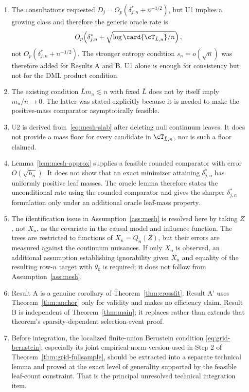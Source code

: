 \begin{enumerate}[label=(\alph*),leftmargin=*]

\item The consultations requested
$D_j=O_p(\delta^*_{j,n}+n^{-1/2})$, but U1 implies a growing class and therefore
the generic oracle rate is
\[
 O_p\!\left(\delta^*_{j,n}
   +\sqrt{\log\card{\cT_{\bar L,n}}/n}\right),
\]
not $O_p(\delta^*_{j,n}+n^{-1/2})$.  The stronger entropy condition
$s_n=o(\sqrt n)$ was therefore added for Results A and B.  U1 alone is enough
for consistency but not for the DML product condition.

\item The existing condition $\bar Lm_n\lesssim n$ with fixed $\bar L$ does not
by itself imply $m_n/n\to0$.  The latter was stated explicitly because it is
needed to make the positive-mass comparator asymptotically feasible.

\item U2 is derived from~\eqref{eq:mesh-slab} after deleting null continuum
leaves.  It does not provide a mass floor for every candidate in
$\cT_{\bar L,n}$, nor is such a floor claimed.

\item Lemma~\ref{lem:mesh-approx} supplies a feasible rounded comparator with
error $O(\sqrt{h_n})$.  It does not show that an exact minimizer attaining
$\delta^*_{j,n}$ has uniformly positive leaf masses.  The oracle lemma
therefore states the unconditional rate using the rounded comparator and gives
the sharper $\delta^*_{j,n}$ formulation only under an additional oracle
leaf-mass property.

\item The identification issue in Assumption~\ref{ass:mesh} is resolved here
by taking $Z$, not $X_n$, as the covariate in the causal model and influence
function.  The trees are restricted to functions of $X_n=Q_n(Z)$, but their
errors are measured against the continuum nuisances.  If only $X_n$ is observed,
an additional assumption establishing ignorability given $X_n$ and equality of
the resulting row-$n$ target with $\theta_0$ is required; it does not follow
from Assumption~\ref{ass:mesh}.

\item Result A is a genuine corollary of Theorem~\ref{thm:crossfit}.  Result A'
uses Theorem~\ref{thm:anchor} only for validity and makes no efficiency claim.
Result B is independent of Theorem~\ref{thm:main}; it replaces rather than
extends that theorem's sparsity-dependent selection-event proof.

\item Before integration, the localized finite-union Bernstein condition
\eqref{eq:grid-bernstein}, especially its joint empirical-norm version used in
Step 2 of Theorem~\ref{thm:grid-fullsample}, should be extracted into a
separate technical lemma and proved at the exact level of generality supported
by the feasible leaf-count constraint.  That is the principal unresolved
technical integration item.

\end{enumerate}


